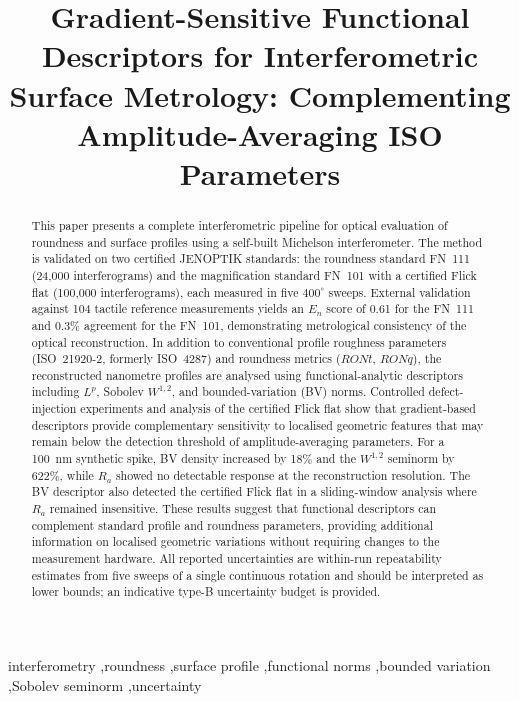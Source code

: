 \documentclass[review]{elsarticle}
\begin{document}
\begin{frontmatter}

\title{Gradient-Sensitive Functional Descriptors for Interferometric Surface Metrology: Complementing Amplitude-Averaging ISO Parameters}


\begin{abstract}
This paper presents a complete interferometric pipeline for optical evaluation of roundness and surface profiles using a self-built Michelson interferometer. The method is validated on two certified JENOPTIK standards: the roundness standard FN~111 (24,000 interferograms) and the magnification standard FN~101 with a certified Flick flat (100,000 interferograms), each measured in five $400^\circ$ sweeps. External validation against 104 tactile reference measurements yields an $E_n$ score of 0.61 for the FN~111 and 0.3\% agreement for the FN~101, demonstrating metrological consistency of the optical reconstruction. In addition to conventional profile roughness parameters (ISO~21920-2, formerly ISO~4287) and roundness metrics ($RONt$, $RONq$), the reconstructed nanometre profiles are analysed using functional-analytic descriptors including $L^p$, Sobolev $W^{1,2}$, and bounded-variation (BV) norms. Controlled defect-injection experiments and analysis of the certified Flick flat show that gradient-based descriptors provide complementary sensitivity to localised geometric features that may remain below the detection threshold of amplitude-averaging parameters. For a 100~nm synthetic spike, BV density increased by 18\% and the $W^{1,2}$ seminorm by 622\%, while $R_a$ showed no detectable response at the reconstruction resolution. The BV descriptor also detected the certified Flick flat in a sliding-window analysis where $R_a$ remained insensitive. These results suggest that functional descriptors can complement standard profile and roundness parameters, providing additional information on localised geometric variations without requiring changes to the measurement hardware. All reported uncertainties are within-run repeatability estimates from five sweeps of a single continuous rotation and should be interpreted as lower bounds; an indicative type-B uncertainty budget is provided.
\end{abstract}

\begin{keyword}
interferometry \sep roundness \sep surface profile \sep functional norms \sep bounded variation \sep Sobolev seminorm \sep uncertainty
\end{keyword}

\end{frontmatter}
\end{document}
